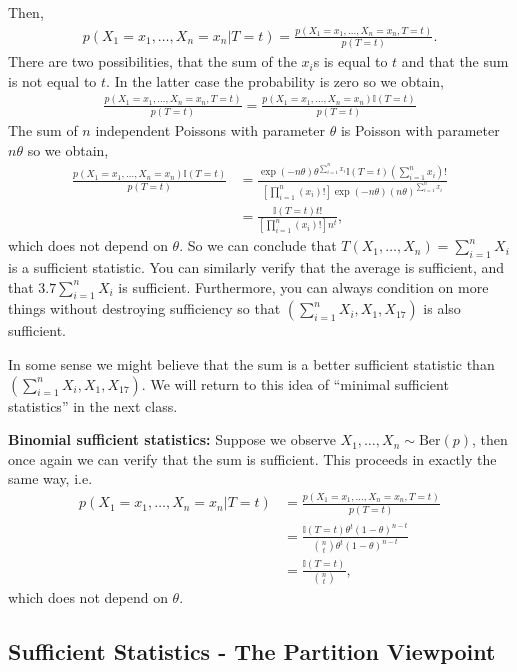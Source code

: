 \documentclass[twoside,12pt]{article}
\begin{document}
Then,
\begin{align*}
p(X_1=x_1,\ldots,X_n=x_n|T=t) = \frac{p(X_1=x_1,\ldots,X_n=x_n,T=t)}{p(T=t)}.
\end{align*}
There are two possibilities, that the sum of the $x_i$s is equal to $t$ and that the sum is not equal to $t$. In the latter case the probability is zero so we obtain,
\begin{align*}
\frac{p(X_1=x_1,\ldots,X_n=x_n,T=t)}{p(T=t)} = \frac{p(X_1=x_1,\ldots,X_n=x_n) \mathbb{I}(T = t)}{p(T=t)}
\end{align*}
The sum of $n$ independent Poissons with parameter $\theta$ is Poisson with parameter $n \theta$ so we obtain,
\begin{align*}
\frac{p(X_1=x_1,\ldots,X_n=x_n) \mathbb{I}(T = t)}{p(T=t)} &= \frac{\exp(-n\theta) \theta^{\sum_{i=1}^n x_i} \mathbb{I}(T = t) (\sum_{i=1}^n x_i)! }{ \left[\prod_{i=1}^n (x_i)! \right] \exp(-n\theta) (n \theta)^{\sum_{i=1}^n x_i} } \\
&= \frac{\mathbb{I}(T = t) t! } { \left[\prod_{i=1}^n (x_i)! \right] n^t},
\end{align*}
which does not depend on $\theta$. So we can conclude that $T(X_1,\ldots,X_n) = \sum_{i=1}^n X_i$ is a sufficient statistic. You can similarly verify that the average is sufficient, and that $3.7 \sum_{i=1}^n X_i$ is sufficient. Furthermore, you can always condition on more things without destroying sufficiency 
so that $(\sum_{i=1}^n X_i, X_1,X_{17})$ is also sufficient.

In some sense we might believe that the sum is a better sufficient statistic than $(\sum_{i=1}^n X_i, X_1,X_{17})$. We will return to this idea of ``minimal sufficient statistics'' in the next class.

{\bf Binomial sufficient statistics: } Suppose we observe $X_1,\ldots,X_n \sim \text{Ber}(p)$, then once again we can verify that the sum is sufficient. This proceeds in exactly the same way, i.e.
\begin{align*}
p(X_1=x_1,\ldots,X_n=x_n|T=t) &= \frac{p(X_1=x_1,\ldots,X_n=x_n,T=t)}{p(T=t)}  \\
&= \frac{\mathbb{I}(T = t) \theta^t (1 - \theta)^{n-t}}{ {n \choose t} \theta^t (1 - \theta)^{n-t}} \\
&=  \frac{\mathbb{I}(T = t)}{{n \choose t}},
\end{align*}
which does not depend on $\theta$.

\subsection{Sufficient Statistics - The Partition Viewpoint}
\end{document}
